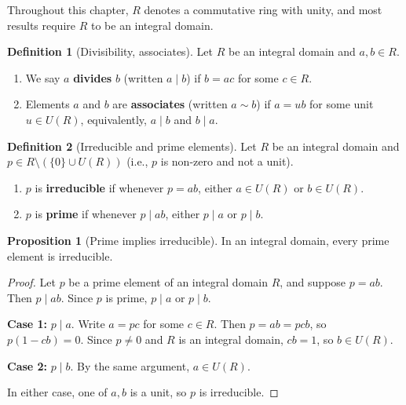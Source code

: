 \documentclass[12pt,a4paper,openany]{book}
\theoremstyle{definition}
\newtheorem{definition}{Definition}[chapter]
\newtheorem{proposition}{Proposition}[chapter]
\theoremstyle{remark}
\begin{document}
Throughout this chapter, $R$ denotes a commutative ring with unity, and most results require $R$ to be an integral domain.

\begin{definition}[Divisibility, associates]\label{def:divisibility}
Let $R$ be an integral domain and $a,b\in R$.
\begin{enumerate}[label=(\roman*)]
    \item We say $a$ \textbf{divides} $b$ (written $a\mid b$) if $b=ac$ for some $c\in R$.
    \item Elements $a$ and $b$ are \textbf{associates} (written $a\sim b$) if $a=ub$ for some unit $u\in U(R)$, equivalently, $a\mid b$ and $b\mid a$.
\end{enumerate}
\end{definition}

\begin{definition}[Irreducible and prime elements]\label{def:irreducible-prime}
Let $R$ be an integral domain and $p\in R\setminus(\{0\}\cup U(R))$ (i.e., $p$ is non-zero and not a unit).
\begin{enumerate}[label=(\roman*)]
    \item $p$ is \textbf{irreducible} if whenever $p=ab$, either $a\in U(R)$ or $b\in U(R)$.
    \item $p$ is \textbf{prime} if whenever $p\mid ab$, either $p\mid a$ or $p\mid b$.
\end{enumerate}
\end{definition}

\begin{proposition}[Prime implies irreducible]\label{prop:prime-implies-irred}
In an integral domain, every prime element is irreducible.
\end{proposition}

\begin{proof}
Let $p$ be a prime element of an integral domain $R$, and suppose $p=ab$. Then $p\mid ab$. Since $p$ is prime, $p\mid a$ or $p\mid b$.

\textbf{Case 1:} $p\mid a$. Write $a=pc$ for some $c\in R$. Then $p=ab=pcb$, so $p(1-cb)=0$. Since $p\neq 0$ and $R$ is an integral domain, $cb=1$, so $b\in U(R)$.

\textbf{Case 2:} $p\mid b$. By the same argument, $a\in U(R)$.

In either case, one of $a,b$ is a unit, so $p$ is irreducible.
\end{proof}
\end{document}
